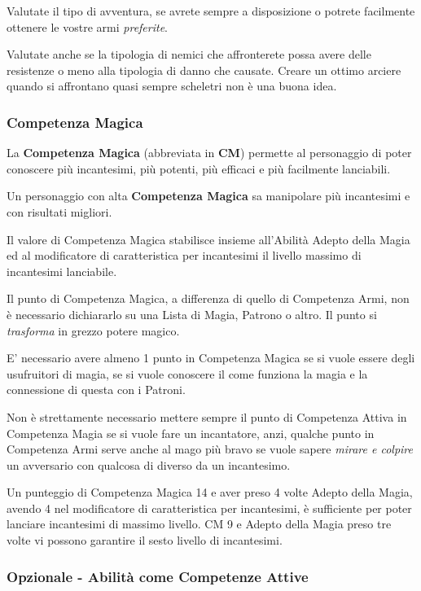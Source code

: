 \begin{multicols}{2}
\begin{changemargin}{0.3cm}{0.3cm}
\begin{tcolorbox}[title = Specializzarsi o meno in un arma]
Valutate il tipo di avventura, se avrete sempre a disposizione o potrete facilmente ottenere le vostre armi \emph{preferite}.

Valutate anche se la tipologia di nemici che affronterete possa avere delle resistenze o meno alla tipologia di danno che causate. Creare un ottimo arciere quando si affrontano quasi sempre scheletri non è una buona idea.
\end{tcolorbox}\end{changemargin}

\subsubsection{Competenza Magica}\label{competenzamagica}

La \textbf{Competenza Magica} (abbreviata in \textbf{CM}) permette al personaggio di poter conoscere più incantesimi, più potenti, più efficaci e più facilmente lanciabili.

Un personaggio con alta \textbf{Competenza Magica} sa manipolare più incantesimi e con risultati migliori.

Il valore di Competenza Magica stabilisce insieme all'Abilità Adepto della Magia ed al modificatore di caratteristica per incantesimi il livello massimo di incantesimi lanciabile.

Il punto di Competenza Magica, a differenza di quello di Competenza Armi, non è necessario dichiararlo su una Lista di Magia, Patrono o altro. Il punto si \emph{trasforma} in grezzo potere magico.

E' necessario avere almeno 1 punto in Competenza Magica se si vuole essere degli usufruitori di magia, se si vuole conoscere il come funziona la magia e la connessione di questa con i Patroni.

Non è strettamente necessario mettere sempre il punto di Competenza Attiva in Competenza Magia se si vuole fare un incantatore, anzi, qualche punto in Competenza Armi serve anche al mago più bravo se vuole sapere \emph{mirare e colpire} un avversario con qualcosa di diverso da un incantesimo.

Un punteggio di Competenza Magica 14 e aver preso 4 volte Adepto della Magia, avendo 4 nel modificatore di caratteristica per incantesimi, è sufficiente per poter lanciare incantesimi di massimo livello. CM 9 e Adepto della Magia preso tre volte vi possono garantire il sesto livello di incantesimi.

\subsubsection{Opzionale - Abilità come Competenze Attive}


\end{multicols}
